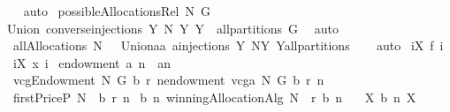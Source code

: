 \begin{isabellebody}
\isadelimproof
\ %
\endisadelimproof
%
\isatagproof
{}\isamarkupfalse%
\ auto%
\endisatagproof
{\isafoldproof}%
%
\isadelimproof
%
\endisadelimproof
\isanewline
\isanewline
{}\isamarkupfalse%
\ {\isachardoublequoteopen}possibleAllocationsRel\ N\ G\ {\isacharequal}\isanewline
Union\ {\isacharbraceleft}converse{\isacharbackquote}{\isacharparenleft}injections\ Y\ N{\isacharparenright}{\isacharbar}\ Y{\isachardot}\ Y\ {\isasymin}\ all{\isacharunderscore}partitions\ G{\isacharbraceright}{\isachardoublequoteclose}\ \isanewline
%
\isadelimproof
%
\endisadelimproof
%
\isatagproof
{}\isamarkupfalse%
\ auto%
\endisatagproof
{\isafoldproof}%
%
\isadelimproof
\isanewline
%
\endisadelimproof
\isanewline
{}\isamarkupfalse%
\ {\isachardoublequoteopen}allAllocations\ N\ {\isasymOmega}\ {\isacharequal}\ Union{\isacharbraceleft}{\isacharbraceleft}a{\isacharcircum}{\isacharminus}{}{\isacharbar}a{\isachardot}\ a{\isasymin}injections\ Y\ N{\isacharbraceright}{\isacharbar}Y{\isachardot}\ Y{\isasymin}all{\isacharunderscore}partitions\ {\isasymOmega}{\isacharbraceright}{\isachardoublequoteclose}%
\isadelimproof
\ %
\endisadelimproof
%
\isatagproof
{}\isamarkupfalse%
\ auto%
\endisatagproof
{\isafoldproof}%
%
\isadelimproof
%
\endisadelimproof
\isanewline
{}\isamarkupfalse%
\ {\isachardoublequoteopen}{\isacharparenleft}{\isasymSum}i{\isasymin}X{\isachardot}\ f\ i{\isacharparenright}{\isachardoublequoteclose}\isanewline
{}\isamarkupfalse%
\ {\isachardoublequoteopen}{\isacharparenleft}{\isasymUnion}i{\isasymin}X{\isachardot}\ x\ i{\isacharparenright}{\isachardoublequoteclose}\isanewline
{}\isamarkupfalse%
\ {\isachardoublequoteopen}endowment\ a\ n\ {\isacharequal}{\isacharequal}\ a{\isacharcomma}{\isacharcomma}{\isacharcomma}n{\isachardoublequoteclose}\isanewline
{}\isamarkupfalse%
\ {\isachardoublequoteopen}vcgEndowment\ N\ G\ b\ r\ n{\isacharequal}{\isacharequal}endowment\ {\isacharparenleft}vcga\ N\ G\ b\ r{\isacharparenright}\ n{\isachardoublequoteclose}\isanewline
\isanewline
\isanewline
\isanewline
{}\isamarkupfalse%
\ {\isachardoublequoteopen}firstPriceP\ N\ {\isasymOmega}\ b\ r\ n\ {\isacharequal}{\isacharequal}\isanewline
b\ {\isacharparenleft}n{\isacharcomma}\ winningAllocationAlg\ N\ {\isasymOmega}\ r\ b{\isacharcomma}{\isacharcomma}\ n{\isacharparenright}{\isachardoublequoteclose}\isanewline
\isanewline
{}\isamarkupfalse%
\ \ {\isachardoublequoteopen}{\isasymforall}\ X{\isachardot}\ b\ {\isacharparenleft}n{\isacharcomma}\ X{\isacharparenright}\ {\isasymge}\ {}{\isachardoublequoteclose}\ \isanewline

\end{isabellebody}
